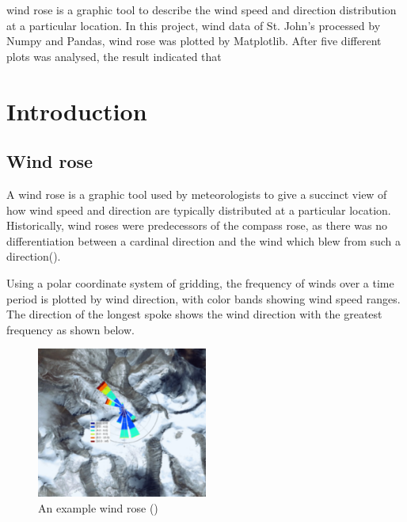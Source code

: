 \documentclass[10pt]{report}
\begin{document}
wind rose is a graphic tool to describe the wind speed and direction distribution at a particular location. In this project, wind data of St. John's processed by Numpy and Pandas, wind rose was plotted by Matplotlib. After five different plots was analysed, the result indicated that


\singlespacing          %
\listoffigures          %


 \tableofcontents


 \chapter{Introduction}     %
 
 \section{Wind rose}

A wind rose is a graphic tool used by meteorologists to give a succinct view of how wind speed and direction are typically distributed at a particular location. Historically, wind roses were predecessors of the compass rose, as there was no differentiation between a cardinal direction and the wind which blew from such a direction(\cite{wikipedia}). \par Using a polar coordinate system of gridding, the frequency of winds over a time period is plotted by wind direction, with color bands showing wind speed ranges. The direction of the longest spoke shows the wind direction with the greatest frequency as shown below. \par

\begin{figure}[h!]
    \centering
    \includegraphics[width=0.50\textwidth]{images/example.png}
    \caption{An example wind rose (\cite{Roubeyrie2018})}
    \label{fig: PaleBlueDot}
\end{figure}
\end{document}
